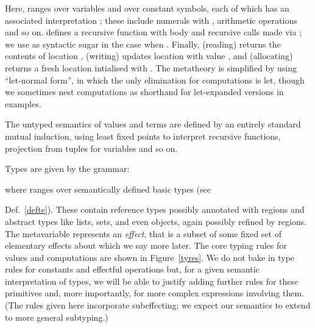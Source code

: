 \documentclass[orivec]{llncs}
\newif\iffull\fullfalse
\renewcommand{\paragraph}[1]{\noindent {\bf #1}}
\newcommand{\squelch}[1]{}
\begin{document}
\noindent
Here,  ranges over variables and  over constant
\fi
symbols, each of which has an associated interpretation
; these include numerals  with
, arithmetic operations and so on.
 defines a recursive function with body  and
recursive calls made via ; we use  as syntactic sugar in
the
case when . Finally,  (reading) returns
the contents of location ,  (writing) updates
location  with value , and  (allocating) returns a
fresh location intialised with . The metatheory is simplified by
using ``let-normal form'', in which the only elimination for
computations is let, though we sometimes nest computations as
shorthand for let-expanded versions in examples.

\paragraph{Semantics}
The untyped semantics of values 
and terms  are defined by an
entirely standard mutual induction, using least fixed points to
interpret recursive functions, projection from tuples for variables
and so on.
\squelch{
are given by
the recursive clauses in Figure~\ref{seme}; note the overloading of
semantic brackets for constants, values and computations. 
The notation
 stands for the -th projection from 
if  is  and  (functionally) updates the
-th slot in  when .
}

\paragraph{Types}
Types are given by the grammar:
\iffull

where  ranges over semantically defined basic types (see
\else

where  ranges over semantically defined basic types (see
\fi
Def.~\ref{defte}). These contain reference types possibly
annotated with regions and abstract types like lists, sets, and even
objects, again possibly refined by regions. The metavariable 
represents an \emph{effect}, that is a subset of some fixed set of
elementary effects about which we say more later. The core typing
rules for values and computations are shown in
Figure~\ref{tyres}. We do not bake in type rules for
constants and effectful operations but, for a given semantic interpretation
of types, we will be able to justify adding further rules for these
primitives and, more importantly, for more complex expressions
involving them. (The rules given here incorporate
subeffecting; we expect our semantics to extend
to more general subtyping.)
\end{document}
